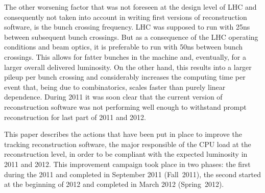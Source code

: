 The other worsening factor that was not foreseen at the design level
of LHC and consequently not taken into account in writing first
versions of reconstruction software, is the bunch crossing
frequency. LHC was supposed to run with 25ns between subsequent bunch
crossings. But as a consequence of the LHC operating conditions and
beam optics, it is preferable to run with 50ns between bunch
crossings. This allows for fatter bunches in the machine and,
eventually, for a larger overall delivered luminosity. On the other
hand, this results into a larger pileup per bunch crossing and
considerably increases the computing time per event that, being due to
combinatorics, scales faster than purely linear dependence.
During 2011 it was soon clear that the current version of
reconstruction software was not performing well enough to withstand prompt
reconstruction for last part of 2011 and 2012. 

This paper describes the actions that have been put in place to
improve the tracking reconstruction software, the major responsible of
the CPU load at the reconstruction level, in order to be compliant
with the expected luminosity in 2011 and 2012. This improvement
campaign took place in two phases: the first during the 2011 and
completed in September 2011 (Fall~2011), the second started at the
beginning of 2012 and completed in March 2012 (Spring~2012).
